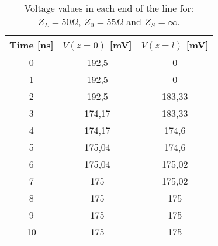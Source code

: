 \begin{table}[H]
\centering
\caption{Voltage values in each end of the line for: $Z_L = 50 \Omega$, $Z_0 = 55 \Omega$ and $Z_S = \infty$.}
\label{table2}
\begin{tabular}{|c|c|c|}
\hline
Time {[}ns{]} & $V(z=0)$ {[}mV{]} & $V(z=l)$ {[}mV{]} \\ \hline
0             & 192,5             & 0                 \\ \hline
1             & 192,5             & 0                 \\ \hline
2             & 192,5             & 183,33            \\ \hline
3             & 174,17            & 183,33            \\ \hline
4             & 174,17            & 174,6             \\ \hline
5             & 175,04            & 174,6             \\ \hline
6             & 175,04            & 175,02            \\ \hline
7             & 175               & 175,02            \\ \hline
8             & 175               & 175               \\ \hline
9             & 175               & 175               \\ \hline
10            & 175               & 175               \\ \hline
\end{tabular}
\end{table}